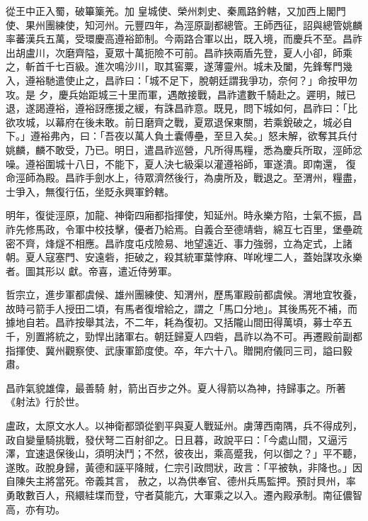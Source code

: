 \begin{pinyinscope}
 從王中正入蜀，破篳篥羌。加
 皇城使、榮州刺史、秦鳳路鈐轄，又加西上閣門使、果州團練使，知河州。元豐四年，為涇原副都總管。王師西征，詔與總管姚麟率蕃漢兵五萬，受環慶高遵裕節制。今兩路合軍以出，既入境，而慶兵不至。昌祚出胡盧川，次磨齊隘，夏眾十萬扼險不可前。昌祚挾兩盾先登，夏人小卻，師乘之，斬首千七百級。進次鳴沙川，取其窖粟，遂薄靈州。城未及闔，先鋒奪門幾入，遵裕馳遣使止之，昌祚曰：「城不足下，脫朝廷謂我爭功，奈何？」命按甲勿攻。是
 夕，慶兵始距城三十里而軍，遇敵接戰，昌祚遣數千騎赴之。遲明，賊已退，遂謁遵裕，遵裕訝應援之緩，有誅昌祚意。既見，問下城如何，昌祚曰：「比欲攻城，以幕府在後未敢。前日磨齊之戰，夏眾退保東關，若乘銳破之，城必自下。」遵裕弗內，曰：「吾夜以萬人負土囊傅壘，至旦入矣。」怒未解，欲奪其兵付姚麟，麟不敢受，乃已。明日，遣昌祚巡營，凡所得馬糧，悉為慶兵所取，涇師忿噪。遵裕圍城十八日，不能下，夏人決七級渠以灌遵裕師，軍遂潰。即南還，
 復命涇師為殿。昌祚手劍水上，待眾濟然後行，為虜所及，戰退之。至渭州，糧盡，士爭入，無復行伍，坐貶永興軍鈐轄。



 明年，復徙涇原，加龍、神衛四廂都指揮使，知延州。時永樂方陷，士氣不振，昌祚先修馬政，令軍中校技擊，優者乃給焉。自義合至德靖砦，綿互七百里，堡壘疏密不齊，烽燧不相應。昌祚度屯戍險易、地望遠近、事力強弱，立為定式，上諸朝。夏人寇塞門、安遠砦，拒破之，殺其統軍葉悖麻、咩吪埋二人，蓋始謀攻永樂者。圖其形以
 獻。帝喜，遣近侍勞軍。



 哲宗立，進步軍都虞候、雄州團練使、知渭州，歷馬軍殿前都虞候。渭地宜牧養，故時弓箭手人授田二頃，有馬者復增給之，謂之「馬口分地」。其後馬死不補，而據地自若。昌祚按舉其法，不二年，耗為復初。又括隴山間田得萬頃，募士卒五千，別置將統之，勁悍出諸軍右。朝廷歸夏人四砦，昌祚以為不可。再遷殿前副都指揮使、冀州觀察使、武康軍節度使。卒，年六十八。贈開府儀同三司，謚曰毅肅。



 昌祚氣貌雄偉，最善騎
 射，箭出百步之外。夏人得箭以為神，持歸事之。所著《射法》行於世。



 盧政，太原文水人。以神衛都頭從劉平與夏人戰延州。虜薄西南隅，兵不得成列，政自變量騎挑戰，發伏弩二百射卻之。日且暮，政說平曰：「今處山間，又逼污澤，宜速退保後山，須明決鬥；不然，彼夜出，乘高蹙我，何以御之？」平不聽，遂敗。政脫身歸，黃德和誣平降賊，仁宗引政問狀，政言：「平被執，非降也。」因自陳失主將當死。帝義其言，
 赦之，以為供奉官、德州兵馬監押。預討貝州，率勇敢數百人，飛繯絓堞而登，守者莫能亢，大軍乘之以入。遷內殿承制。南征儂智高，亦有功。




\end{pinyinscope}
